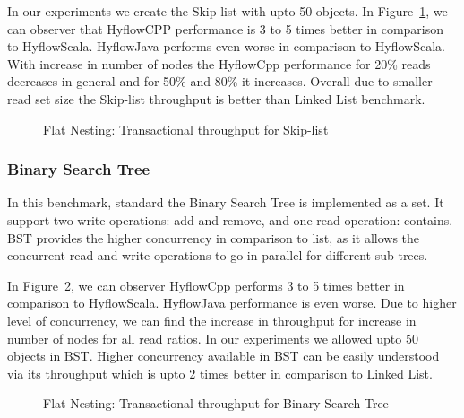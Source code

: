 \documentclass[12pt,english]{report}
\begin{document}
In our experiments we create the Skip-list with upto 50 objects. In Figure~\ref{Fig:flatSkipList}, we can observer that HyflowCPP performance is 3 to 5 times better in comparison to HyflowScala. HyflowJava performs even worse in comparison to HyflowScala. With increase in number of nodes the HyflowCpp performance for 20\% reads decreases in general and for 50\% and 80\%  it increases. Overall due to smaller read set size the Skip-list throughput is better than Linked List benchmark. 

\begin{figure}[H]
\centering
{}
\end{figure}
\begin{figure}[H]
\centering
{}
\end{figure}
\begin{figure}[H]
\centering
{}
\caption{Flat Nesting: Transactional throughput for Skip-list}
\label{Fig:flatSkipList}
\end{figure}

\subsubsection{Binary Search Tree}
In this benchmark, standard the Binary Search Tree is implemented as a set. It support two write operations: add and remove, and one read operation: contains. BST provides the higher concurrency in comparison to list, as it allows the concurrent read and write operations to go in parallel for different sub-trees. 

In Figure~\ref{Fig:flatBst}, we can observer HyflowCpp performs 3 to 5 times better in comparison to HyflowScala. HyflowJava performance is even worse. Due to higher level of concurrency, we can find the increase in throughput for increase in number of nodes for all read ratios. In our experiments we allowed upto 50 objects in BST. Higher concurrency available in BST can be easily understood via its throughput which  is upto 2 times better in comparison to Linked List.

\begin{figure}[H]
\centering
{}
\end{figure}
\begin{figure}[H]
\centering
{}
\end{figure}
\begin{figure}[H]
\centering
{}
\caption{Flat Nesting: Transactional throughput for Binary Search Tree}
\label{Fig:flatBst}
\end{figure}
\end{document}
